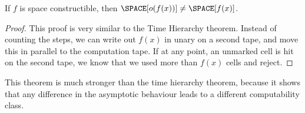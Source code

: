 \begin{theorem}
	If $f$ is space constructible, then $\SPACE[o(f(x))] \neq \SPACE[f(x)]$.
\end{theorem}
\begin{proof}
	This proof is very similar to the Time Hierarchy theorem. Instead of 
	counting the steps, we can write out $f(x)$ in unary on a second tape, and 
	move this in parallel to the computation tape. If at any point, an unmarked 
	cell is hit on the second tape, we know that we used more than $f(x)$ cells 
	and reject.
\end{proof}
This theorem is much stronger than the time hierarchy theorem, because it 
shows that any difference in the asymptotic behaviour leads to a different 
computability class.
